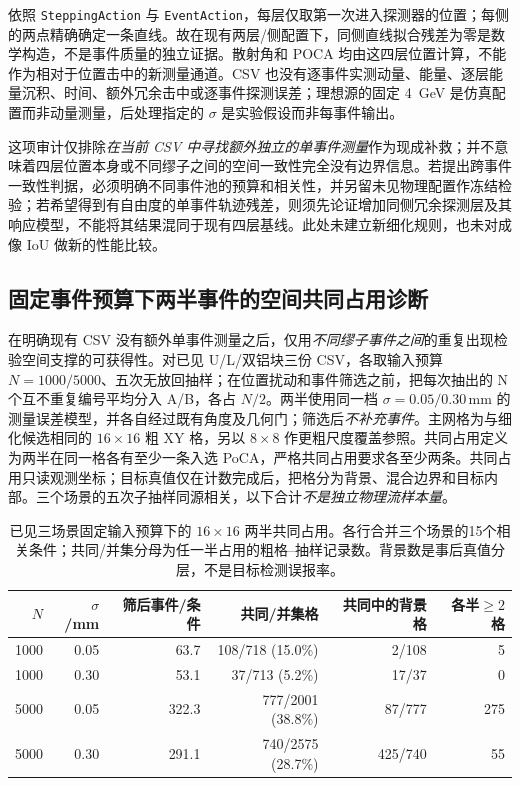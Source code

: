\documentclass[UTF8,fontset=none,zihao=-4,a4paper]{ctexart}
\begin{document}
依照 \texttt{SteppingAction} 与 \texttt{EventAction}，每层仅取第一次进入探测器的位置；每侧的两点精确确定一条直线。故在现有两层/侧配置下，同侧直线拟合残差为零是数学构造，不是事件质量的独立证据。散射角和 POCA 均由这四层位置计算，不能作为相对于位置击中的新测量通道。CSV 也没有逐事件实测动量、能量、逐层能量沉积、时间、额外冗余击中或逐事件探测误差；理想源的固定 \SI{4}{GeV} 是仿真配置而非动量测量，后处理指定的 $\sigma$ 是实验假设而非每事件输出。

这项审计仅排除\emph{在当前 CSV 中寻找额外独立的单事件测量}作为现成补救；并不意味着四层位置本身或不同缪子之间的空间一致性完全没有边界信息。若提出跨事件一致性判据，必须明确不同事件池的预算和相关性，并另留未见物理配置作冻结检验；若希望得到有自由度的单事件轨迹残差，则须先论证增加同侧冗余探测层及其响应模型，不能将其结果混同于现有四层基线。此处未建立新细化规则，也未对成像 IoU 做新的性能比较。

\subsection{固定事件预算下两半事件的空间共同占用诊断}
在明确现有 CSV 没有额外单事件测量之后，仅用\emph{不同缪子事件之间}的重复出现检验空间支撑的可获得性。对已见 U/L/双铝块三份 CSV，各取输入预算 $N=1000/5000$、五次无放回抽样；在位置扰动和事件筛选之前，把每次抽出的 N 个互不重复编号平均分入 A/B，各占 $N/2$。两半使用同一档 $\sigma=0.05/0.30\,\mathrm{mm}$ 的测量误差模型，并各自经过既有角度及几何门；筛选后\emph{不补充事件}。主网格为与细化候选相同的 $16\times16$ 粗 XY 格，另以 $8\times8$ 作更粗尺度覆盖参照。共同占用定义为两半在同一格各有至少一条入选 PoCA，严格共同占用要求各至少两条。共同占用只读观测坐标；目标真值仅在计数完成后，把格分为背景、混合边界和目标内部。三个场景的五次子抽样同源相关，以下合计\emph{不是独立物理流样本量}。

\begin{table}[H]
\centering
\caption{已见三场景固定输入预算下的 $16\times16$ 两半共同占用。各行合并三个场景的15个相关条件；共同/并集分母为任一半占用的粗格--抽样记录数。背景数是事后真值分层，不是目标检测误报率。}
\label{tab:disjoint-spatial-support}
\small
\begin{tabular}{rrrrrr}
\toprule
$N$ & $\sigma$/mm & 筛后事件/条件 & 共同/并集格 & 共同中的背景格 & 各半$\geq2$格\\
\midrule
1000 & 0.05 & 63.7 & 108/718 (15.0\%) & 2/108 & 5\\
1000 & 0.30 & 53.1 & 37/713 (5.2\%) & 17/37 & 0\\
5000 & 0.05 & 322.3 & 777/2001 (38.8\%) & 87/777 & 275\\
5000 & 0.30 & 291.1 & 740/2575 (28.7\%) & 425/740 & 55\\
\bottomrule
\end{tabular}
\end{table}
\end{document}
